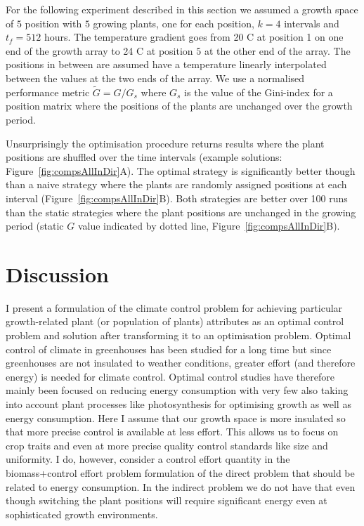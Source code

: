 For the following experiment described in this section we assumed a growth space
of $5$ position with $5$ growing plants, one for each position, $k=4$ intervals
and $t_f=512$ hours. The temperature gradient goes from 20 \textdegree C at
position 1 on one end of the growth array to 24 \textdegree C at position $5$ at
the other end of the array. The positions in between are assumed have a
temperature linearly interpolated between the values at the two ends of the
array. We use a normalised performance metric $\tilde{G}=G/G_s$ where $G_s$ is
the value of the Gini-index for a position matrix where the positions of the
plants are unchanged over the growth period.

Unsurprisingly the optimisation procedure returns results where the plant
positions are shuffled over the time intervals (example solutions:
Figure~\ref{fig:compsAllInDir}A). The optimal strategy is significantly better
though than a naive strategy where the plants are randomly assigned positions at
each interval (Figure~\ref{fig:compsAllInDir}B). Both strategies are better over
100 runs than the static strategies where the plant positions are unchanged in
the growing period (static $G$ value indicated by dotted line,
Figure~\ref{fig:compsAllInDir}B).


\section{Discussion}
I present a formulation of the climate control problem for achieving particular
growth-related plant (or population of plants) attributes as an optimal control
problem and solution after transforming it to an optimisation problem. Optimal
control of climate in greenhouses has been studied for a long time but since
greenhouses are not insulated to weather conditions, greater effort (and
therefore energy) is needed for climate control. Optimal control studies have
therefore mainly been focused on reducing energy consumption \citep{fisher1997,
ramirezarias2012, delsagrado2016} with very few also taking into account plant
processes like photosynthesis for optimising growth as well as energy
consumption\citep{harun2015, aaslyng2003}. Here I assume that our growth space
is more insulated so that more precise control is available at less effort. This
allows us to focus on crop traits and even at more precise quality control
standards like size and uniformity. I do, however, consider a control effort
quantity in the biomass+control effort problem formulation of the direct problem
that should be related to energy consumption. In the indirect problem we do not
have that even though switching the plant positions will require significant
energy even at sophisticated growth environments.  %


